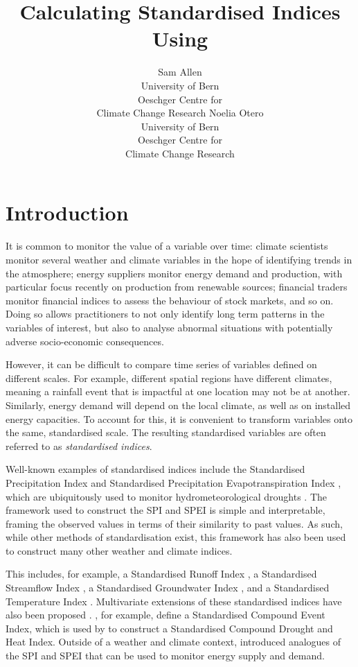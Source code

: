\documentclass[article,shortnames,nojss]{jss}\usepackage[]{graphicx}\usepackage[]{xcolor}
\author{Sam Allen\\University of Bern\\Oeschger Centre for \\Climate Change Research
\And Noelia Otero\\University of Bern\\Oeschger Centre for \\Climate Change Research}
\title{Calculating Standardised Indices Using \pkg{SEI}}
\begin{document}
\section{Introduction}

It is common to monitor the value of a variable over time: climate scientists monitor several weather and climate variables in the hope of identifying trends in the atmosphere; energy suppliers monitor energy demand and production, with particular focus recently on production from renewable sources; financial traders monitor financial indices to assess the behaviour of stock markets, and so on. Doing so allows practitioners to not only identify long term patterns in the variables of interest, but also to analyse abnormal situations with potentially adverse socio-economic consequences.

However, it can be difficult to compare time series of variables defined on different scales. For example, different spatial regions have different climates, meaning a rainfall event that is impactful at one location may not be at another. Similarly, energy demand will depend on the local climate, as well as on installed energy capacities. To account for this, it is convenient to transform variables onto the same, standardised scale. The resulting standardised variables are often referred to as \emph{standardised indices}.

Well-known examples of standardised indices include the Standardised Precipitation Index \citep[SPI;][]{McKeeEtAl1993} and Standardised Precipitation Evapotranspiration Index \citep[SPEI;][]{VicenteEtAl2010}, which are ubiquitously used to monitor hydrometeorological droughts \citep{BegueriaEtAl2014}. The framework used to construct the SPI and SPEI is simple and interpretable, framing the observed values in terms of their similarity to past values. As such, while other methods of standardisation exist, this framework has also been used to construct many other weather and climate indices.

This includes, for example, a Standardised Runoff Index \citep{ShuklaWood2008}, a Standardised Streamflow Index \citep{VicenteEtAl2012}, a Standardised Groundwater Index \citep{BloomfieldMarchant2013}, and a Standardised Temperature Index \citep{ZscheischlerEtAl2014}. Multivariate extensions of these standardised indices have also been proposed \citep{ErhardtCzado2018}. \cite{HaoEtAl2019}, for example, define a Standardised Compound Event Index, which is used by \cite{LiEtAl2021} to construct a Standardised Compound Drought and Heat Index. Outside of a weather and climate context, \cite{AllenOtero2023} introduced analogues of the SPI and SPEI that can be used to monitor energy supply and demand.
\end{document}

